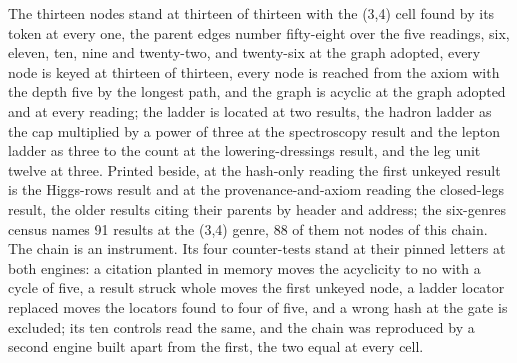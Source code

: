 \begin{chproof}[instrument]
The thirteen nodes stand at thirteen of thirteen with the (3,4) cell found by its token at every one, the parent edges number fifty-eight over the five readings, six, eleven, ten, nine and twenty-two, and twenty-six at the graph adopted, every node is keyed at thirteen of thirteen, every node is reached from the axiom with the depth five by the longest path, and the graph is acyclic at the graph adopted and at every reading; the ladder is located at two results, the hadron ladder as the cap multiplied by a power of three at the spectroscopy result and the lepton ladder as three to the count at the lowering-dressings result, and the leg unit twelve at three. Printed beside, at the hash-only reading the first unkeyed result is the Higgs-rows result and at the provenance-and-axiom reading the closed-legs result, the older results citing their parents by header and address; the six-genres census names 91 results at the (3,4) genre, 88 of them not nodes of this chain. The chain is an instrument. Its four counter-tests stand at their pinned letters at both engines: a citation planted in memory moves the acyclicity to no with a cycle of five, a result struck whole moves the first unkeyed node, a ladder locator replaced moves the locators found to four of five, and a wrong hash at the gate is excluded; its ten controls read the same, and the chain was reproduced by a second engine built apart from the first, the two equal at every cell.
\end{chproof}
